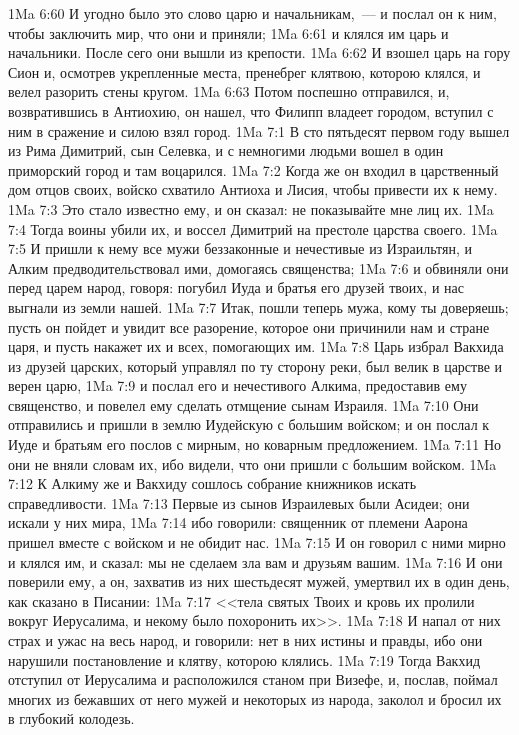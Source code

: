 \vs 1Ma 6:60 И угодно было это слово царю и начальникам,~--- и послал он к ним, чтобы заключить мир, что они и приняли;
\vs 1Ma 6:61 и клялся им царь и начальники. После сего они вышли из крепости.
\vs 1Ma 6:62 И взошел царь на гору Сион и, осмотрев укрепленные места, пренебрег клятвою, которою клялся, и велел разорить стены кругом.
\vs 1Ma 6:63 Потом поспешно отправился, и, возвратившись в Антиохию, он нашел, что Филипп владеет городом, вступил с ним в сражение и силою взял город.
\vs 1Ma 7:1 В сто пятьдесят первом году вышел из Рима Димитрий, сын Селевка, и с немногими людьми вошел в один приморский город и там воцарился.
\vs 1Ma 7:2 Когда же он входил в царственный дом отцов своих, войско схватило Антиоха и Лисия, чтобы привести их к нему.
\vs 1Ma 7:3 Это стало известно ему, и он сказал: не показывайте мне лиц их.
\vs 1Ma 7:4 Тогда воины убили их, и воссел Димитрий на престоле царства своего.
\vs 1Ma 7:5 И пришли к нему все мужи беззаконные и нечестивые из Израильтян, и Алким предводительствовал ими, домогаясь священства;
\vs 1Ma 7:6 и обвиняли они перед царем народ, говоря: погубил Иуда и братья его друзей твоих, и нас выгнали из земли нашей.
\vs 1Ma 7:7 Итак, пошли теперь мужа, кому ты доверяешь; пусть он пойдет и увидит все разорение, которое они причинили нам и стране царя, и пусть накажет их и всех, помогающих им.
\vs 1Ma 7:8 Царь избрал Вакхида из друзей царских, который управлял по ту сторону реки, был велик в царстве и верен царю,
\vs 1Ma 7:9 и послал его и нечестивого Алкима, предоставив ему священство, и повелел ему сделать отмщение сынам Израиля.
\vs 1Ma 7:10 Они отправились и пришли в землю Иудейскую с большим войском; и он послал к Иуде и братьям его послов с мирным, но коварным предложением.
\vs 1Ma 7:11 Но они не вняли словам их, ибо видели, что они пришли с большим войском.
\vs 1Ma 7:12 К Алкиму же и Вакхиду сошлось собрание книжников искать справедливости.
\vs 1Ma 7:13 Первые из сынов Израилевых были Асидеи; они искали у них мира,
\vs 1Ma 7:14 ибо говорили: священник от племени Аарона пришел вместе с войском и не обидит нас.
\vs 1Ma 7:15 И он говорил с ними мирно и клялся им, и сказал: мы не сделаем зла вам и друзьям вашим.
\vs 1Ma 7:16 И они поверили ему, а он, захватив из них шестьдесят мужей, умертвил их в один день, как сказано в Писании:
\vs 1Ma 7:17 <<тела святых Твоих и кровь их пролили вокруг Иерусалима, и некому было похоронить их>>.
\vs 1Ma 7:18 И напал от них страх и ужас на весь народ, и говорили: нет в них истины и правды, ибо они нарушили постановление и клятву, которою клялись.
\vs 1Ma 7:19 Тогда Вакхид отступил от Иерусалима и расположился станом при Визефе, и, послав, поймал многих из бежавших от него мужей и некоторых из народа, заколол и бросил их в глубокий колодезь.
